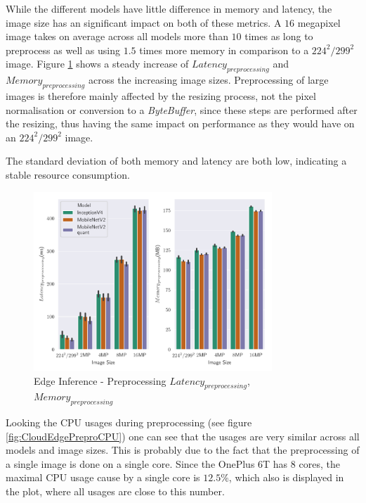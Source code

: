 While the different models have little difference in memory and latency, the image size has an significant impact on both of these metrics.
A $16$ megapixel image takes on average across all models more than $10$ times as long to preprocess as well as using $1.5$ times more memory in comparison to a $224^2/299^2$ image.
Figure \ref{fig:EdgePrepro} shows a steady increase of $Latency_{preprocessing}$ and $Memory_{preprocessing}$ across the increasing image sizes.
Preprocessing of large images is therefore mainly affected by the resizing process, not the pixel normalisation or conversion to a \emph{ByteBuffer}, since these steps are performed after the resizing, thus having the same impact on performance as they would have on an $224^2/299^2$ image.

The standard deviation of both memory and latency are both low, indicating a stable resource consumption.



\begin{figure}[H]
\centering
\includegraphics[width=0.8\textwidth]{./Bilder/single_plots/edge_inference_plots/Edge_Inference_Preprocessing.pdf}
\caption{Edge Inference - Preprocessing $Latency_{preprocessing}$, $Memory_{preprocessing}$}
\label{fig:EdgePrepro}
\end{figure}
Looking the CPU usages during preprocessing (see figure \ref{fig:CloudEdgePreproCPU}) one can see that the usages are very similar across all models and image sizes. This is probably due to the fact that the preprocessing of a single image is done on a single core. Since the OnePlus 6T has $8$ cores, the maximal CPU usage cause by a single core is $12.5\%$, which also is displayed in the plot, where all usages are close to this number.


